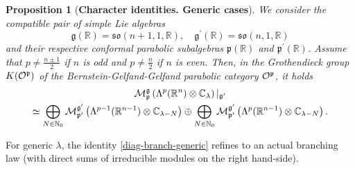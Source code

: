 \documentclass[a4paper,12pt,reqno]{amsart}
\newtheorem{prop}[theorem]{Proposition}
\numberwithin{theorem}{subsection}
\numberwithin{equation}{section}
\begin{document}
\begin{prop}[\bf Character identities. Generic cases]\label{charind} We consider the
compatible pair of simple Lie algebras
\begin{equation*}
   {{\mathfrak g}}({\mathbb{R}}) = \mathfrak{so}(n\!+\!1,1,{\mathbb{R}}), \quad {{\mathfrak g}}^\prime({\mathbb{R}}) = \mathfrak{so}(n,1,{\mathbb{R}})
\end{equation*}
and their respective conformal parabolic subalgebras ${{\mathfrak p}}({\mathbb{R}})$ and
${{\mathfrak p}}^\prime({\mathbb{R}})$. Assume that $p \ne \frac{n \pm 1}{2}$ if $n$ is odd and $p
\ne \frac{n}{2}$ if $n$ is even. Then, in the Grothendieck group $K({\fam2
O}^{{\mathfrak p}})$ of the Bernstein-Gelfand-Gelfand parabolic category ${\fam2
O}^{{\mathfrak p}}$, it holds
\begin{multline}\label{diag-branch-generic}
   {\fam2 M}^{{\mathfrak g}}_{{\mathfrak p}}\left(\Lambda^p({\mathbb{R}}^n) \otimes {\mathbb{C}}_\lambda\right)|_{{{\mathfrak g}}^\prime} \\
   \simeq \bigoplus_{N \in {\mathbb{N}}_0} {\fam2M}^{{{\mathfrak g}}^\prime}_{{{\mathfrak p}}^\prime}
   \left(\Lambda^{p-1}({\mathbb{R}}^{n-1}) \otimes{\mathbb{C}}_{\lambda-N}\right) \oplus
   \bigoplus_{N \in {\mathbb{N}}_0} {\fam2M}^{{{\mathfrak g}}^\prime}_{{{\mathfrak p}}^\prime}
   \left(\Lambda^{p}({\mathbb{R}}^{n-1}) \otimes{\mathbb{C}}_{\lambda-N}\right).
\end{multline}
\end{prop}

For generic $\lambda$, the identity \eqref{diag-branch-generic} refines to an
actual branching law (with direct sums of irreducible modules on the right
hand-side).
\end{document}
